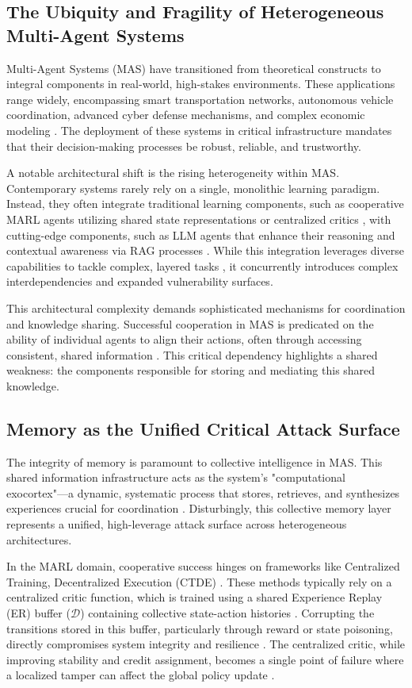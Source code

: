 \documentclass[conference]{IEEEtran}
\begin{document}
\subsection{The Ubiquity and Fragility of Heterogeneous Multi-Agent Systems}
Multi-Agent Systems (MAS) have transitioned from theoretical constructs to integral components in real-world, high-stakes environments. These applications range widely, encompassing smart transportation networks, autonomous vehicle coordination, advanced cyber defense mechanisms, and complex economic modeling \cite{Ref3, Ref4, Ref5}. The deployment of these systems in critical infrastructure mandates that their decision-making processes be robust, reliable, and trustworthy.

A notable architectural shift is the rising heterogeneity within MAS. Contemporary systems rarely rely on a single, monolithic learning paradigm. Instead, they often integrate traditional learning components, such as cooperative MARL agents utilizing shared state representations or centralized critics \cite{Ref6}, with cutting-edge components, such as LLM agents that enhance their reasoning and contextual awareness via RAG processes \cite{Ref2, Ref7}. While this integration leverages diverse capabilities to tackle complex, layered tasks \cite{Ref8}, it concurrently introduces complex interdependencies and expanded vulnerability surfaces.

This architectural complexity demands sophisticated mechanisms for coordination and knowledge sharing. Successful cooperation in MAS is predicated on the ability of individual agents to align their actions, often through accessing consistent, shared information \cite{Ref9}. This critical dependency highlights a shared weakness: the components responsible for storing and mediating this shared knowledge.

\subsection{Memory as the Unified Critical Attack Surface}
The integrity of memory is paramount to collective intelligence in MAS. This shared information infrastructure acts as the system's "computational exocortex"—a dynamic, systematic process that stores, retrieves, and synthesizes experiences crucial for coordination \cite{Ref1}. Disturbingly, this collective memory layer represents a unified, high-leverage attack surface across heterogeneous architectures.

In the MARL domain, cooperative success hinges on frameworks like Centralized Training, Decentralized Execution (CTDE) \cite{Ref6, Ref10}. These methods typically rely on a centralized critic function, which is trained using a shared Experience Replay (ER) buffer ($\mathcal{D}$) containing collective state-action histories \cite{Ref11}. Corrupting the transitions stored in this buffer, particularly through reward or state poisoning, directly compromises system integrity and resilience \cite{Ref12, Ref13}. The centralized critic, while improving stability and credit assignment, becomes a single point of failure where a localized tamper can affect the global policy update \cite{Ref6}.
\end{document}
